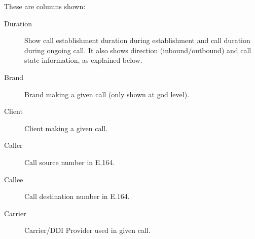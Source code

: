 \documentclass[letterpaper,10pt,english]{sphinxmanual}
\begin{document}
These are columns shown:
\begin{description}
\item[{Duration}] \leavevmode{}\label{administration_portal/platform/active_calls:term-duration}
Show call establishment duration during establishment and call duration during ongoing call. It also shows
direction (inbound/outbound) and call state information, as explained below.

\item[{Brand}] \leavevmode{}\label{administration_portal/platform/active_calls:term-brand}
Brand making a given call (only shown at god level).

\item[{Client}] \leavevmode{}\label{administration_portal/platform/active_calls:term-client}
Client making a given call.

\item[{Caller}] \leavevmode{}\label{administration_portal/platform/active_calls:term-caller}
Call source number in E.164.

\item[{Callee}] \leavevmode{}\label{administration_portal/platform/active_calls:term-callee}
Call destination number in E.164.

\item[{Carrier}] \leavevmode{}\label{administration_portal/platform/active_calls:term-carrier}
Carrier/DDI Provider used in given call.

\end{description}
\end{document}
